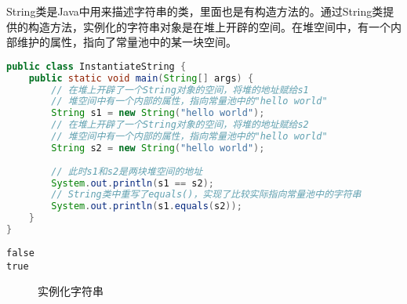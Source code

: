 String类是Java中用来描述字符串的类，里面也是有构造方法的。通过String类提供的构造方法，实例化的字符串对象是在堆上开辟的空间。在堆空间中，有一个内部维护的属性，指向了常量池中的某一块空间。\\


\begin{lstlisting}[language=Java]
public class InstantiateString {
    public static void main(String[] args) {
        // 在堆上开辟了一个String对象的空间，将堆的地址赋给s1
        // 堆空间中有一个内部的属性，指向常量池中的"hello world"
        String s1 = new String("hello world");
        // 在堆上开辟了一个String对象的空间，将堆的地址赋给s2
        // 堆空间中有一个内部的属性，指向常量池中的"hello world"
        String s2 = new String("hello world");
        
        // 此时s1和s2是两块堆空间的地址
        System.out.println(s1 == s2);
        // String类中重写了equals()，实现了比较实际指向常量池中的字符串
        System.out.println(s1.equals(s2));
    }
}
\end{lstlisting}

\begin{tcolorbox}
	\begin{verbatim}
false
true
	\end{verbatim}
\end{tcolorbox}

\begin{figure}[H]
	\centering
	\caption{实例化字符串}
\end{figure}

\newpage

